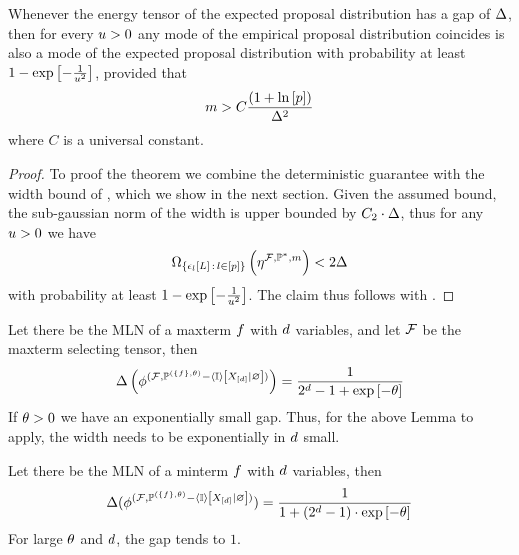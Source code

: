 \begin{theorem}
    \label{the:probGuaranteeProposalDist}
    Whenever the energy tensor of the expected proposal distribution has a gap of $\Delta$, then for every $u>0$ any mode of the empirical proposal distribution coincides is also a mode of the expected proposal distribution with probability at least $1-\mathrm{exp}\left[-\frac{1}{u^2}\right]$, provided that
    \begin{align*}
        m > C\frac{(1+\ln \left[ p \right])}{\Delta^2}
    \end{align*}
    where $C$ is a universal constant.
\end{theorem}
\begin{proof}
    To proof the theorem we combine the deterministic guarantee  with the width bound of , which we show in the next section.
    Given the assumed bound, the sub-gaussian norm of the width is upper bounded by $C_2\cdot \Delta$, thus for any $u>0$ we have
    \begin{align*}
        \Omega_{\{\epsilon_{l}\left[L\right] \,:\, l\in[p] \}}\left(\eta^{\mathcal{F},\mathbb{P}^*,m}\right)  < 2 \Delta
    \end{align*}
    with probability at least $1-\mathrm{exp}\left[-\frac{1}{u^2}\right]$.
    The claim thus follows with .
\end{proof}


\begin{example}
    Let there be the MLN of a maxterm $f$ with $d$ variables, and let $\mathcal{F}$ be the maxterm selecting tensor, then
    \[ \Delta\left(
        \phi^{(\mathcal{F}, \mathbb{P}^{(\{f\},\theta)} - \left\langle \mathbb{I}\right\rangle \left[ X_{[d]} | \varnothing \right] )}
    \right) = \frac{1}{2^{d}-1 + \mathrm{exp}\left[-\theta\right]}  \]
    If $\theta>0$ we have an exponentially small gap.
    Thus, for the above Lemma to apply, the width needs to be exponentially in $d$ small.


    Let there be the MLN of a minterm $f$ with $d$ variables, then
    \[ \Delta(
    \phi^{(\mathcal{F}, \mathbb{P}^{(\{f\},\theta)} - \left\langle \mathbb{I}\right\rangle \left[ X_{[d]} | \varnothing \right] )}
    ) = \frac{1}{1+(2^{d}-1)\cdot\mathrm{exp}\left[-\theta\right]}  \]
    For large $\theta$ and $d$, the gap tends to $1$.
\end{example}


